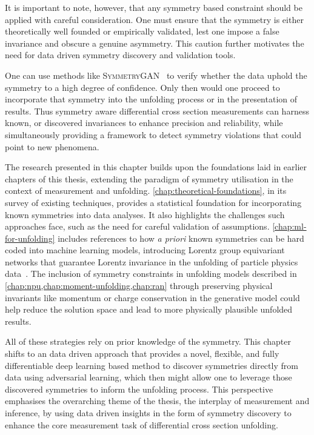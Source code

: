         It is important to note, however, that any symmetry based constraint should be applied with careful consideration. One must ensure that the symmetry is either theoretically well founded or empirically validated, lest one impose a false invariance and obscure a genuine asymmetry.
        This caution further motivates the need for data driven symmetry discovery and validation tools.
        
        One can use methods like \textsc{SymmetryGAN}~\cite{PhysRevD.105.096031} to verify whether the data uphold the symmetry to a high degree of confidence.
        Only then would one proceed to incorporate that symmetry into the unfolding process or in the presentation of results.
        Thus symmetry aware differential cross section measurements can harness known, or discovered invariances to enhance precision and reliability, while simultaneously providing a framework to detect symmetry violations that could point to new phenomena.
    
    The research presented in this chapter builds upon the foundations laid in earlier chapters of this thesis, extending the paradigm of symmetry utilisation in the context of measurement and unfolding.
    \cref{chap:theoretical-foundations}, in its survey of existing techniques, provides a statistical foundation for incorporating known symmetries into data analyses.
    It also highlights the challenges such approaches face, such as the need for careful validation of assumptions.
    \cref{chap:ml-for-unfolding} includes references to how \textit{a priori} known symmetries can be hard coded into machine learning models, introducing Lorentz group equivariant networks that guarantee Lorentz invariance in the unfolding of particle physics data~\cite{Bogatskiy:2020tje}.
    The inclusion of symmetry constraints in unfolding models described in \cref{chap:npu,chap:moment-unfolding,chap:ran} through preserving physical invariants like momentum or charge conservation in the generative model could help reduce the solution space and lead to more physically plausible unfolded results.
    
    All of these strategies rely on prior knowledge of the symmetry.
    This chapter shifts to an data driven approach that provides a novel, flexible, and fully differentiable deep learning based method to discover symmetries directly from data using adversarial learning, which then might allow one to leverage those discovered symmetries to inform the unfolding process.
    This perspective emphasises the overarching theme of the thesis, the interplay of measurement and inference, by using data driven insights in the form of symmetry discovery to enhance the core measurement task of differential cross section unfolding.

